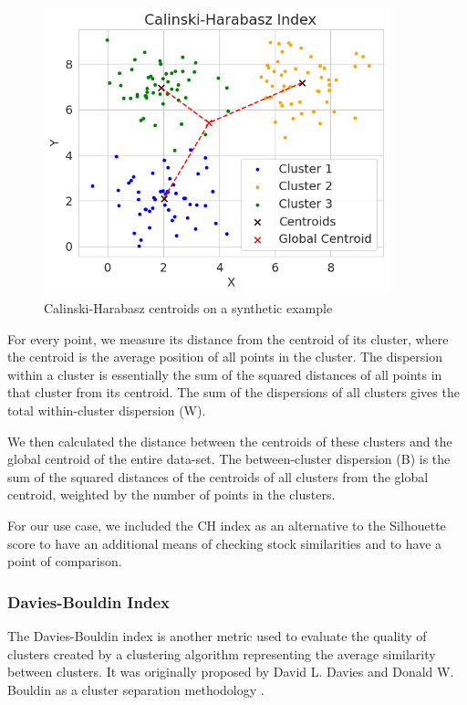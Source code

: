 \documentclass[11pt]{article}
\begin{document}
\begin{figure}[H] 
\centering
\includegraphics[width=10cm]{img/ch.png} 
\caption{Calinski-Harabasz centroids on a synthetic example}
\label{fig:ch}
\end{figure}

For every point, we measure its distance from the centroid of its cluster, where the centroid is the average position of all points in the cluster. The dispersion within a cluster is essentially the sum of the squared distances of all points in that cluster from its centroid.
The sum of the dispersions of all clusters gives the total within-cluster dispersion (W).

We then calculated the distance between the centroids of these clusters and the global centroid of the entire data-set. The between-cluster dispersion (B) is the sum of the squared distances of the centroids of all clusters from the global centroid, weighted by the number of points in the clusters.

For our use case, we included the CH index as an alternative to the Silhouette score to have an additional means of checking stock similarities and to have a point of comparison. 

\subsubsection{Davies-Bouldin Index}

The Davies-Bouldin index is another metric used to evaluate the quality of clusters created by a clustering algorithm representing the average similarity between clusters. It was originally proposed by David L. Davies and Donald W. Bouldin as a cluster separation methodology \cite{davies}. 
\end{document}
